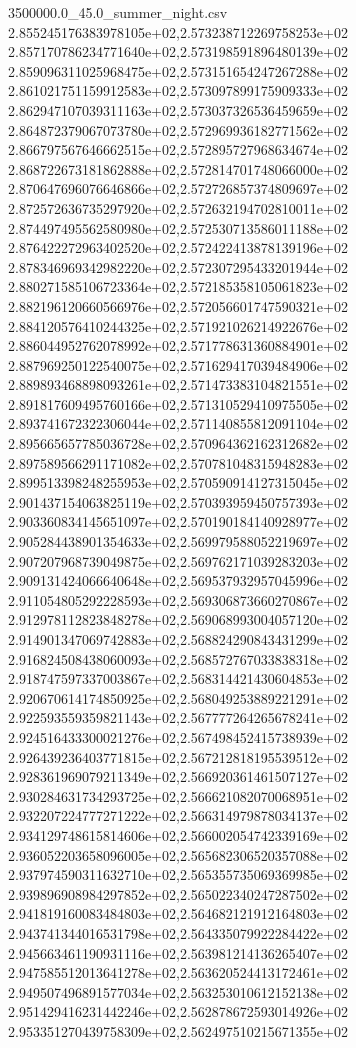 \begin{filecontents*}{3500000.0_45.0_summer_night.csv}
2.855245176383978105e+02,2.573238712269758253e+02
2.857170786234771640e+02,2.573198591896480139e+02
2.859096311025968475e+02,2.573151654247267288e+02
2.861021751159912583e+02,2.573097899175909333e+02
2.862947107039311163e+02,2.573037326536459659e+02
2.864872379067073780e+02,2.572969936182771562e+02
2.866797567646662515e+02,2.572895727968634674e+02
2.868722673181862888e+02,2.572814701748066000e+02
2.870647696076646866e+02,2.572726857374809697e+02
2.872572636735297920e+02,2.572632194702810011e+02
2.874497495562580980e+02,2.572530713586011188e+02
2.876422272963402520e+02,2.572422413878139196e+02
2.878346969342982220e+02,2.572307295433201944e+02
2.880271585106723364e+02,2.572185358105061823e+02
2.882196120660566976e+02,2.572056601747590321e+02
2.884120576410244325e+02,2.571921026214922676e+02
2.886044952762078992e+02,2.571778631360884901e+02
2.887969250122540075e+02,2.571629417039484906e+02
2.889893468898093261e+02,2.571473383104821551e+02
2.891817609495760166e+02,2.571310529410975505e+02
2.893741672322306044e+02,2.571140855812091104e+02
2.895665657785036728e+02,2.570964362162312682e+02
2.897589566291171082e+02,2.570781048315948283e+02
2.899513398248255953e+02,2.570590914127315045e+02
2.901437154063825119e+02,2.570393959450757393e+02
2.903360834145651097e+02,2.570190184140928977e+02
2.905284438901354633e+02,2.569979588052219697e+02
2.907207968739049875e+02,2.569762171039283203e+02
2.909131424066640648e+02,2.569537932957045996e+02
2.911054805292228593e+02,2.569306873660270867e+02
2.912978112823848278e+02,2.569068993004057120e+02
2.914901347069742883e+02,2.568824290843431299e+02
2.916824508438060093e+02,2.568572767033838318e+02
2.918747597337003867e+02,2.568314421430604853e+02
2.920670614174850925e+02,2.568049253889221291e+02
2.922593559359821143e+02,2.567777264265678241e+02
2.924516433300021276e+02,2.567498452415738939e+02
2.926439236403771815e+02,2.567212818195539512e+02
2.928361969079211349e+02,2.566920361461507127e+02
2.930284631734293725e+02,2.566621082070068951e+02
2.932207224777271222e+02,2.566314979878034137e+02
2.934129748615814606e+02,2.566002054742339169e+02
2.936052203658096005e+02,2.565682306520357088e+02
2.937974590311632710e+02,2.565355735069369985e+02
2.939896908984297852e+02,2.565022340247287502e+02
2.941819160083484803e+02,2.564682121912164803e+02
2.943741344016531798e+02,2.564335079922284422e+02
2.945663461190931116e+02,2.563981214136265407e+02
2.947585512013641278e+02,2.563620524413172461e+02
2.949507496891577034e+02,2.563253010612152138e+02
2.951429416231442246e+02,2.562878672593014926e+02
2.953351270439758309e+02,2.562497510215671355e+02

\end{filecontents*}
